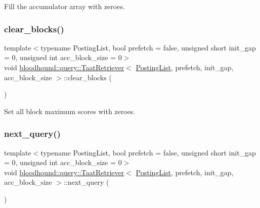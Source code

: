 Fill the accumulator array with zeroes. 

\mbox{\label{classbloodhound_1_1query_1_1TaatRetriever_a00a64711e5d865ba4c53e3accdb61d3f}} 
\subsubsection{\texorpdfstring{clear\+\_\+blocks()}{clear\_blocks()}}
{\footnotesize\ttfamily template$<$typename Posting\+List, bool prefetch = false, unsigned short init\+\_\+gap = 0, unsigned int acc\+\_\+block\+\_\+size = 0$>$ \\
void \mbox{\hyperlink{classbloodhound_1_1query_1_1TaatRetriever}{bloodhound\+::query\+::\+Taat\+Retriever}}$<$ \mbox{\hyperlink{classbloodhound_1_1PostingList}{Posting\+List}}, prefetch, init\+\_\+gap, acc\+\_\+block\+\_\+size $>$\+::clear\+\_\+blocks (\begin{DoxyParamCaption}{ }\end{DoxyParamCaption})\hspace{0.3cm}{\ttfamily [inline]}}



Set all block maximum scores with zeroes. 

\mbox{\label{classbloodhound_1_1query_1_1TaatRetriever_ad6739ab7025c6de9e65945cff25c55b4}} 
\subsubsection{\texorpdfstring{next\+\_\+query()}{next\_query()}}
{\footnotesize\ttfamily template$<$typename Posting\+List, bool prefetch = false, unsigned short init\+\_\+gap = 0, unsigned int acc\+\_\+block\+\_\+size = 0$>$ \\
void \mbox{\hyperlink{classbloodhound_1_1query_1_1TaatRetriever}{bloodhound\+::query\+::\+Taat\+Retriever}}$<$ \mbox{\hyperlink{classbloodhound_1_1PostingList}{Posting\+List}}, prefetch, init\+\_\+gap, acc\+\_\+block\+\_\+size $>$\+::next\+\_\+query (\begin{DoxyParamCaption}{ }\end{DoxyParamCaption})\hspace{0.3cm}{\ttfamily [inline]}}

